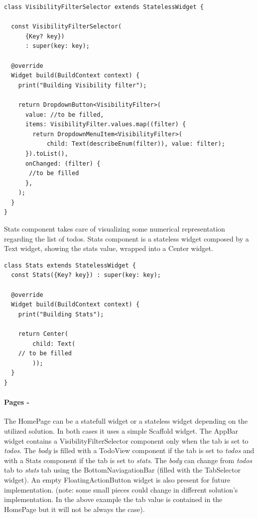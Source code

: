 	\mbox{}
	\begin{code}
 \mbox{}
		\label{code:2.10}
\begin{verbatim}
class VisibilityFilterSelector extends StatelessWidget {

  const VisibilityFilterSelector(
      {Key? key})
      : super(key: key);

  @override
  Widget build(BuildContext context) {
    print("Building Visibility filter");
    
    return DropdownButton<VisibilityFilter>(
      value: //to be filled,
      items: VisibilityFilter.values.map((filter) {
        return DropdownMenuItem<VisibilityFilter>(
            child: Text(describeEnum(filter)), value: filter);
      }).toList(),
      onChanged: (filter) {
       //to be filled
      },
    );
  }
}

	\end{verbatim}
	\end{code}

Stats component takes care of visualizing some numerical representation regarding the list of todos. Stats component is a stateless widget composed by a Text widget, showing the stats value, wrapped into a Center widget.
	
	\mbox{}
	\begin{code}
	 \mbox{}
		\label{code:2.11}
	\begin{verbatim}
class Stats extends StatelessWidget {
  const Stats({Key? key}) : super(key: key);

  @override
  Widget build(BuildContext context) {
    print("Building Stats");

    return Center(
        child: Text(
	// to be filled        
        ));
  }
}
	\end{verbatim}
	\end{code}
	\paragraph{Pages - } 
	\label{par:todo_app_pages}
The HomePage can be a statefull widget or a stateless  widget depending on the utilized solution. In both cases it uses a simple Scaffold widget. The AppBar widget contains a VisibilityFilterSelector component only when the tab is set to \textit{todos}. The \textit{body} is filled with a TodoView component if the tab is set to \textit{todos} and with a Stats component if the tab is set to \textit{stats}. The \textit{body} can change from \textit{todos} tab to \textit{stats} tab using the BottomNaviagationBar (filled with the TabSelector widget). An empty FloatingActionButton widget is also present for future implementation.
	(note: some small pieces could change in different solution’s implementation. In the above example the tab value is contained in the HomePage but it will not be always the case).

